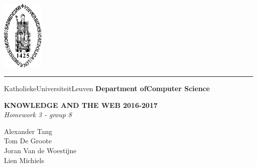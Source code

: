 \begin{titlepage}
    \newpage
    \thispagestyle{empty}
    \frenchspacing
    \hspace{-0.2cm}
    \includegraphics[height=3.4cm]{sedes}
    \hspace{0.2cm}
    \rule{0.5pt}{3.4cm}
    \hspace{0.2cm}
    \begin{minipage}[b]{8cm}
        \Large{Katholieke\newline Universiteit\newline Leuven}\smallskip\newline
        \large{}\smallskip\newline
        \textbf{Department of\newline Computer Science}\smallskip
    \end{minipage}
    \vspace*{3.2cm}\vfill
    \begin{center}
        \begin{minipage}[t]{\textwidth}
            \begin{center}
                \LARGE{\rm{\textbf{\uppercase{Knowledge and the Web 2016-2017}}}}\\
                \Large{\textit{Homework 3 - group 8}}
                
                \vspace{4mm}
                
                \Large{\rm{Alexander Tang}}\\
                \Large{\rm{Tom De Groote}}\\
                \Large{\rm{Joran Van de Woestijne}}\\
                \Large{\rm{Lien Michiels}}
            \end{center}
        \end{minipage}
    \end{center}
    \vfill
    \hfill{}
\end{titlepage}
